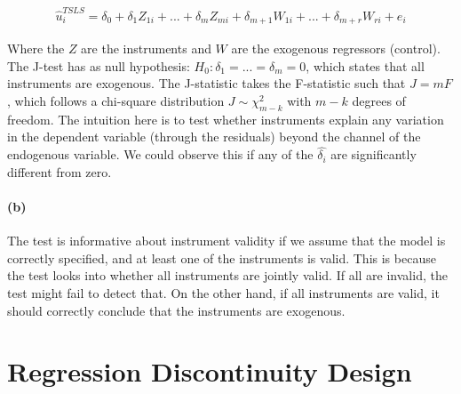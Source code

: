 \documentclass{scrartcl}
\begin{document}
\begin{align}
    \hat{u}^{TSLS}_{i} = \delta_0 + \delta_1Z_{1i} + ...+\delta_mZ_{mi} + \delta_{m+1}W_{1i}  +...+ \delta_{m+r}W_{ri} + e_i
\end{align}

Where the $Z$ are the instruments and $W$ are the exogenous regressors (control). The J-test has as null hypothesis: $H_0:\delta_1=...=\delta_m=0$, which states that all instruments are exogenous. The J-statistic takes the F-statistic such that $J=mF$, which follows a chi-square distribution $J\sim \chi^{2}_{m-k}$ with $m-k$ degrees of freedom. The intuition here is to test whether instruments explain any variation in the dependent variable (through the residuals) beyond the channel of the endogenous variable. We could observe this if any of the $\hat{\delta_i}$ are significantly different from zero.









\paragraph*{(b)}

The test is informative about instrument validity if we assume that the model is correctly specified, and at least one of the instruments is valid. This is because the test looks into whether all instruments are jointly valid. If all are invalid, the test might fail to detect that. On the other hand, if all instruments are valid, it should correctly conclude that the instruments are exogenous. 


\section*{Regression Discontinuity Design}
\end{document}
